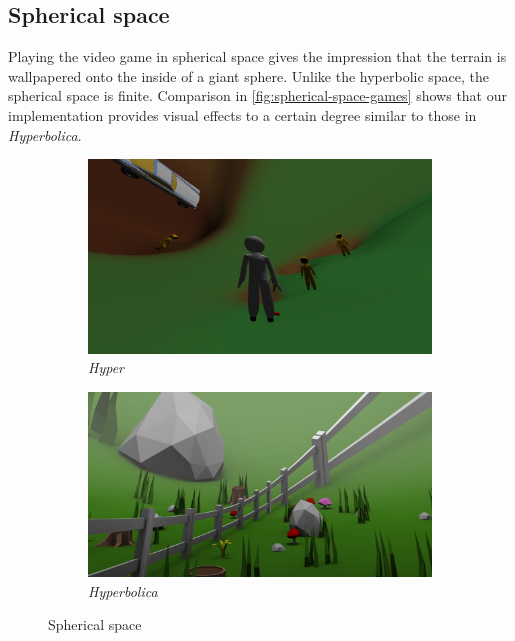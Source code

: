 \subsection{Spherical space}
Playing the video game in spherical space gives the impression that the terrain is wallpapered onto the inside of a giant sphere.
Unlike the hyperbolic space, the spherical space is finite.
Comparison in \autoref{fig:spherical-space-games} shows that our implementation provides visual effects to a certain degree similar to those in \textit{Hyperbolica}.
\begin{figure}[h]
    \centering
    \begin{subfigure}[b]{0.475\textwidth}
        \centering
        \includegraphics[width=\textwidth]{chapters/results/sections/non_euclidean/resources/spherical-in-hyper.png}
        \caption[]%
        {{\small \textit{Hyper}}}
        \label{fig:spherical-space-games-hyper}
    \end{subfigure}
    \hfill
    \begin{subfigure}[b]{0.5\textwidth}
        \centering
        \includegraphics[width=\textwidth]{chapters/results/sections/non_euclidean/resources/hyperbolica-1.png}
        \caption[]%
        {{\small \textit{Hyperbolica \cite{Hyperbolica-Spherical}}}}
        \label{fig:spherical-space-games-hyperbolica}
    \end{subfigure}
    \caption[]
    {\small Spherical space}
    \label{fig:spherical-space-games}
\end{figure}

